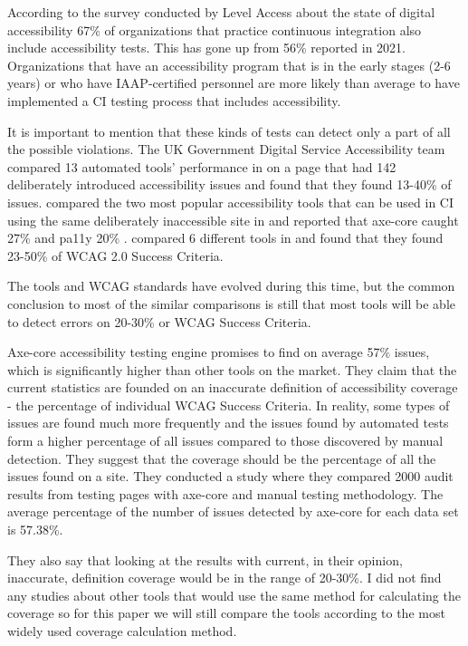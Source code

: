 \documentclass{master_thesis}
\begin{document}
According to the survey conducted by Level Access about the state of digital accessibility 67\% of organizations that practice continuous integration also include accessibility tests. This has gone up from 56\% reported in 2021. Organizations that have an accessibility program that is in the early stages (2-6 years) or who have IAAP-certified personnel are more likely than average to have implemented a CI testing process that includes accessibility. \citep{LevelAccess}

It is important to mention that these kinds of tests can detect only a part of all the possible violations. The UK Government Digital Service Accessibility team compared 13 automated tools' performance in \citeyear{GAT2018} on a page that had 142 deliberately introduced accessibility issues and found that they found 13-40\% of issues. \citeauthor{Abbott2021} compared the two most popular accessibility tools that can be used in CI using the same deliberately inaccessible site in \citeyear{Abbott2021} and reported that axe-core caught 27\% and pa11y 20\% \citep{Abbott2021}. \citeauthor{Vigo2013} compared 6 different tools in \citeyear{Vigo2013} and found that they found 23-50\% of  WCAG 2.0 Success Criteria. \citep{GAT2018, Abbott2021, Vigo2013}

The tools and WCAG standards have evolved during this time, but the common conclusion to most of the similar comparisons is still that most tools will be able to detect errors on 20-30\% or WCAG Success Criteria. 

Axe-core accessibility testing engine promises to find on average 57\% issues, which is significantly higher than other tools on the market\citep{Deque2023}. They claim that the current statistics are founded on an inaccurate definition of accessibility coverage - the percentage of individual WCAG Success Criteria. In reality, some types of issues are found much more frequently and the issues found by automated tests form a higher percentage of all issues compared to those discovered by manual detection. They suggest that the coverage should be the percentage of all the issues found on a site. They conducted a study where they compared 2000 audit results from testing pages with axe-core and manual testing methodology. The average percentage of the number of issues detected by axe-core for each data set is 57.38\%.

They also say that looking at the results with current, in their opinion, inaccurate, definition coverage would be in the range of 20-30\%. \citep{DequeSystems2021report} I did not find any studies about other tools that would use the same method for calculating the coverage so for this paper we will still compare the tools according to the most widely used coverage calculation method.
\end{document}
